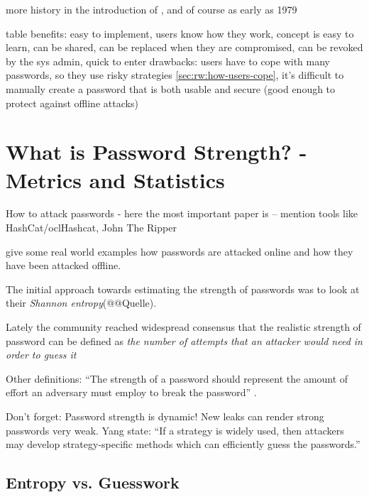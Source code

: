 more history in the introduction of \cite{Bishop1995ProactivePasswordChecking}, and of course as early as 1979 \cite{Morris1979PasswordSecurity}


table 
benefits: easy to implement, users know how they work, concept is easy to learn, can be shared, can be replaced when they are compromised, can be revoked by the sys admin, quick to enter 
drawbacks: users have to cope with many passwords, so they use risky strategies \ref{sec:rw:how-users-cope}, 
it's difficult to manually create a password that is both usable and secure (good enough to protect against offline attacks)


\section{What is Password Strength? - Metrics and Statistics}

How to attack passwords
- here the most important paper is \cite{Ur2015MeasuringRealWorldAccuracies} -- mention tools like HashCat/oclHashcat, John The Ripper 

give some real world examples how passwords are attacked online and how they have been attacked offline. 

The initial approach towards estimating the strength of passwords was to look at their \textit{Shannon entropy}(@@Quelle). 

Lately the community reached widespread consensus that the realistic strength of password can be defined as \textit{the number of attempts that an attacker would need in order to guess it} \cite{Dellamico2015MonteCarlo}

Other definitions: ``The strength of a password should represent the amount of effort an adversary must employ to break the password'' \cite{Carnavalet2014AnalyzingPWStrengthMeters}. 

Don't forget: Password strength is dynamic! New leaks can render strong passwords very weak. Yang \etal state: ``If a strategy is widely used, then attackers may develop strategy-specific methods which can efficiently guess the passwords.''



\cite{Peisert2013PriciplesAuthentication,Bonneau2012ScienceOfGuessing,Scott1995GDMS,Dellamico2015MonteCarlo,Ur2015MeasuringRealWorldAccuracies,Egelman2015SeBIS,Conklin2004PWAuthenticationSystemPerspective,Schmidt2013Pitfalls,Kelley2012GuessAgain,Mazurek2013Measuring,Weir2010MetricsPolicies}

	\subsection{Entropy vs. Guesswork}
	
